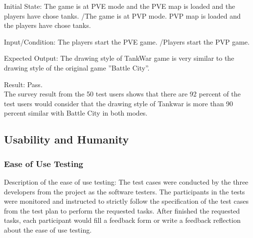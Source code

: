 \documentclass[12pt, titlepage]{article}
\begin{document}
\begin{enumerate}
Initial State: The game is at PVE mode and the PVE map is loaded and the players have chose tanks. /The game is at PVP mode. PVP map is loaded and the players have chose tanks.

Input/Condition: The players start the PVE game. /Players start the PVP game.

Expected Output: The drawing style of TankWar game is very similar to the drawing style of the original game ”Battle City”.

Result: Pass. \\The survey result from the 50 test users shows that there are 92 percent of the test users would consider that the drawing style of Tankwar is more than 90 percent similar with Battle City in both modes.

\end{enumerate}

\subsection{Usability and Humanity}
\subsubsection{Ease of Use Testing}
Description of the ease of use testing: The test cases were conducted by the three developers from the project as the software testers. The participants in the tests were monitored and instructed to strictly follow the specification of the test cases from the test plan to perform the requested tasks. After finished the requested tasks, each participant would fill a feedback form or write a feedback reflection about the ease of use testing.
\end{document}
